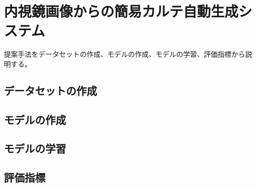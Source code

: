 \section{内視鏡画像からの簡易カルテ自動生成システム}
提案手法をデータセットの作成、モデルの作成、モデルの学習、評価指標から説明する。
\subsection{データセットの作成}
\subsection{モデルの作成}
\subsection{モデルの学習}
\subsection{評価指標}
